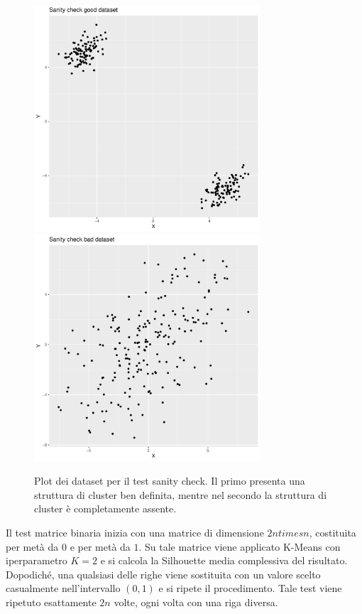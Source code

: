 \documentclass[12pt]{report}
\begin{document}
			\begin{figure}[h]
				\centering
				\includegraphics[width = 0.75\textwidth, height = 0.45\textheight]{doc/sc_dataset_good.pdf}
				\includegraphics[width = 0.75\textwidth, height = 0.45\textheight]{doc/sc_dataset_bad.pdf}
				\caption{Plot dei dataset per il test sanity check. Il primo
				presenta una struttura di cluster ben definita, mentre nel
				secondo la struttura di cluster è completamente assente.}
				\label{fig:sc}
			\end{figure}

			Il test matrice binaria inizia con una matrice di dimensione
			$2n times n$, costituita per metà da $0$ e per metà da $1$.
			Su tale matrice viene applicato K-Means con iperparametro
			$K = 2$ e si calcola la Silhouette media complessiva del
			risultato. Dopodiché, una qualsiasi delle righe viene sostituita
			con un valore scelto casualmente nell'intervallo $(0, 1)$ e si
			ripete il procedimento. Tale test viene ripetuto esattamente
			$2n$ volte, ogni volta con una riga diversa.
\end{document}
